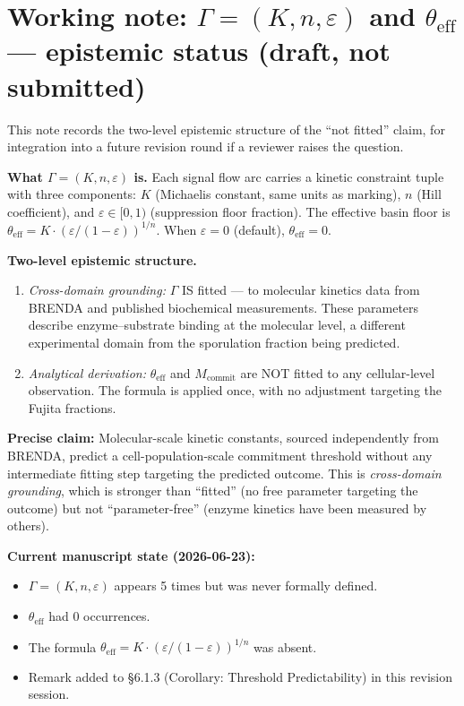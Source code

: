 \documentclass[11pt,letterpaper]{article}
\begin{document}
\section*{Working note: $\Gamma = (K, n, \varepsilon)$ and $\theta_{\mathrm{eff}}$ --- epistemic status (draft, not submitted)}

This note records the two-level epistemic structure of the ``not fitted'' claim,
for integration into a future revision round if a reviewer raises the question.

\textbf{What $\Gamma = (K, n, \varepsilon)$ is.}
Each signal flow arc carries a kinetic constraint tuple with three components:
$K$ (Michaelis constant, same units as marking), $n$ (Hill coefficient), and
$\varepsilon \in [0,1)$ (suppression floor fraction).
The effective basin floor is
$\theta_{\mathrm{eff}} = K \cdot (\varepsilon / (1 - \varepsilon))^{1/n}$.
When $\varepsilon = 0$ (default), $\theta_{\mathrm{eff}} = 0$.

\textbf{Two-level epistemic structure.}
\begin{enumerate}
\item \emph{Cross-domain grounding:} $\Gamma$ IS fitted --- to molecular kinetics
  data from BRENDA and published biochemical measurements. These parameters
  describe enzyme--substrate binding at the molecular level, a different
  experimental domain from the sporulation fraction being predicted.
\item \emph{Analytical derivation:} $\theta_{\mathrm{eff}}$ and $M_{\mathrm{commit}}$
  are NOT fitted to any cellular-level observation. The formula is applied once,
  with no adjustment targeting the Fujita fractions.
\end{enumerate}

\textbf{Precise claim:} Molecular-scale kinetic constants, sourced independently from BRENDA,
predict a cell-population-scale commitment threshold without any intermediate fitting step
targeting the predicted outcome. This is \emph{cross-domain grounding}, which is stronger
than ``fitted'' (no free parameter targeting the outcome) but not ``parameter-free''
(enzyme kinetics have been measured by others).

\textbf{Current manuscript state (2026-06-23):}
\begin{itemize}
\item $\Gamma = (K, n, \varepsilon)$ appears 5 times but was never formally defined.
\item $\theta_{\mathrm{eff}}$ had 0 occurrences.
\item The formula $\theta_{\mathrm{eff}} = K \cdot (\varepsilon/(1-\varepsilon))^{1/n}$ was absent.
\item Remark added to \S6.1.3 (Corollary: Threshold Predictability) in this revision session.
\end{itemize}
\end{document}
